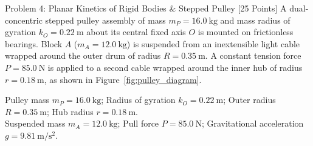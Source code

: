 \documentclass[11pt, a4paper, titlepage=false]{scrartcl}
\begin{document}
\newpage

\begin{problembox}{Problem 4: Planar Kinetics of Rigid Bodies \& Stepped Pulley \hfill [25 Points]}
    A dual-concentric stepped pulley assembly of mass $m_P = \SI{16.0}{\kilogram}$ and mass radius of gyration $k_O = \SI{0.22}{\meter}$ about its central fixed axis $O$ is mounted on frictionless bearings. Block $A$ ($m_A = \SI{12.0}{\kilogram}$) is suspended from an inextensible light cable wrapped around the outer drum of radius $R = \SI{0.35}{\meter}$. A constant tension force $P = \SI{85.0}{\newton}$ is applied to a second cable wrapped around the inner hub of radius $r = \SI{0.18}{\meter}$, as shown in Figure~\ref{fig:pulley_diagram}.

    \begin{givenbox}
        Pulley mass $m_P = \SI{16.0}{\kilogram}$; Radius of gyration $k_O = \SI{0.22}{\meter}$; Outer radius $R = \SI{0.35}{\meter}$; Hub radius $r = \SI{0.18}{\meter}$.\\
        Suspended mass $m_A = \SI{12.0}{\kilogram}$; Pull force $P = \SI{85.0}{\newton}$; Gravitational acceleration $g = \SI{9.81}{\meter\per\second\squared}$.
    \end{givenbox}

    \begin{center}
\end{center}
\end{problembox}
\end{document}
